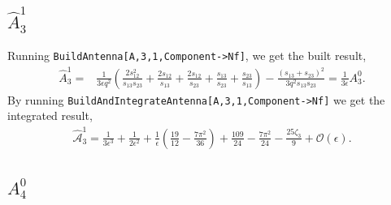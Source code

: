 \subsection{$\hat A_3^1$}

Running \texttt{BuildAntenna[A,3,1,Component->Nf]}, we get the built result,
\begin{align}
    \hat A_3^1 = {}
    &\frac{1}{3\epsilon q^2}\!\left(\frac{2s_{12}^2}{s_{13}s_{23}}+\frac{2s_{12}}{s_{13}}+\frac{2s_{12}}{s_{23}}+\frac{s_{13}}{s_{23}}+\frac{s_{23}}{s_{13}}\right)-\frac{\left(s_{13}+s_{23}\right)^2}{3q^2s_{13}s_{23}} = \frac{1}{3\epsilon}A_3^0.
\end{align}
By running \texttt{BuildAndIntegrateAntenna[A,3,1,Component->Nf]} we get the integrated result, 
\begin{equation}
    \begin{gathered}
        \hat{\mathcal A}_3^1 = \frac1{3\epsilon^3}+\frac1{2\epsilon^2}+\frac1\epsilon\!\left(\frac{19}{12}-\frac{7\pi^2}{36}\right)+\frac{109}{24}-\frac{7\pi^2}{24}-\frac{25\zeta_3}{9}+\mathcal O(\epsilon).
    \end{gathered}
\end{equation}

\subsection{$A_4^0$}

